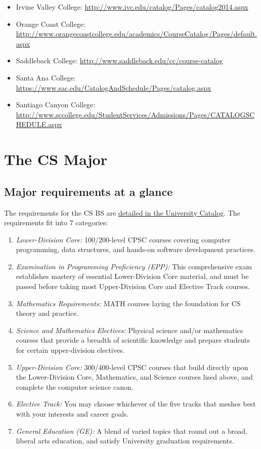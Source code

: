 \documentclass{book}
\begin{document}
\begin{itemize}
\begin{itemize}
    \item Irvine Valley College: \url{http://www.ivc.edu/catalog/Pages/catalog2014.aspx}
    \item Orange Coast College: \url{http://www.orangecoastcollege.edu/academics/CourseCatalog/Pages/default.aspx}
    \item Saddleback College: \url{http://www.saddleback.edu/cc/course-catalog}
    \item Santa Ana College: \url{https://www.sac.edu/CatalogAndSchedule/Pages/catalog.aspx}
    \item Santiago Canyon College: \url{http://www.sccollege.edu/StudentServices/Admissions/Pages/CATALOGSCHEDULE.aspx}
  \end{itemize}
\end{itemize}

\chapter{The CS Major}

\section{Major requirements at a glance}

The requirements for the CS BS are \href{http://catalog.fullerton.edu/preview_program.php?catoid=2&poid=537&returnto=137}{detailed in the University Catalog}. The requirements fit into 7 categories:
\begin{enumerate}
\item \emph{Lower-Division Core:} 100/200-level CPSC courses covering computer programming, data structures, and hands-on software development practices.
\item \emph{Examination in Programming Proficiency (EPP):} This comprehensive exam establishes mastery of essential Lower-Division Core material, and must be passed before taking most Upper-Division Core and Elective Track courses. 
\item \emph{Mathematics Requirements:} MATH courses laying the foundation for CS theory and practice.
\item \emph{Science and Mathematics Electives:} Physical science and/or mathematics courses that provide a breadth of scientific knowledge and prepare students for certain upper-division electives.
\item \emph{Upper-Division Core:} 300/400-level CPSC courses that build directly upon the Lower-Division Core, Mathematics, and Science courses lised above, and complete the computer science canon.
\item \emph{Elective Track:} You may choose whichever of the five tracks that meshes best with your interests and career goals.
\item \emph{General Education (GE):} A blend of varied topics that round out a broad, liberal arts education, and satisfy University graduation requirements.
\end{enumerate}
  
\end{document}
